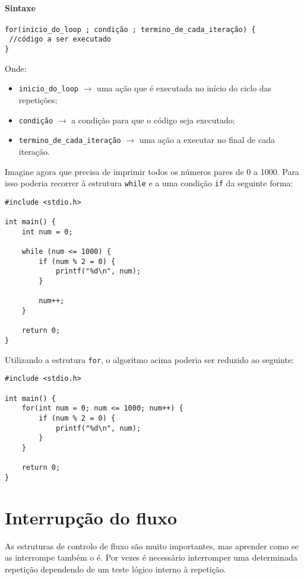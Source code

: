 \paragraph{Sintaxe}

\begin{lstlisting}
for(inicio_do_loop ; condição ; termino_de_cada_iteração) {
 //código a ser executado
}
\end{lstlisting}

Onde:

\begin{itemize}
\item \texttt{inicio\_do\_loop} \(\rightarrow\) uma ação que é executada no início do ciclo das repetições;
\item \texttt{condição} \(\rightarrow\) a condição para que o código seja executado;
\item \texttt{termino\_de\_cada\_iteração} \(\rightarrow\) uma ação a executar no final de cada iteração.
\end{itemize}

Imagine agora que precisa de imprimir todos os números pares de 0 a 1000. Para isso poderia recorrer à estrutura \texttt{while} e a uma condição \texttt{if} da seguinte forma:


\begin{lstlisting}
#include <stdio.h>
 
int main() {
    int num = 0;
 
    while (num <= 1000) {
        if (num % 2 = 0) {
            printf("%d\n", num);
        }
        
        num++;
    }
 
    return 0;
}
\end{lstlisting}

Utilizando a estrutura \texttt{for}, o algoritmo acima poderia ser reduzido ao seguinte:

\begin{lstlisting}
#include <stdio.h>
 
int main() {
    for(int num = 0; num <= 1000; num++) {
        if (num % 2 = 0) {
            printf("%d\n", num);
        }
    }

    return 0;
}
\end{lstlisting}

\section{Interrupção do fluxo}

As estruturas de controlo de fluxo são muito importantes, mas aprender como se as interrompe também o é. Por vezes é necessário interromper uma determinada repetição dependendo de um teste lógico interno à repetição.

